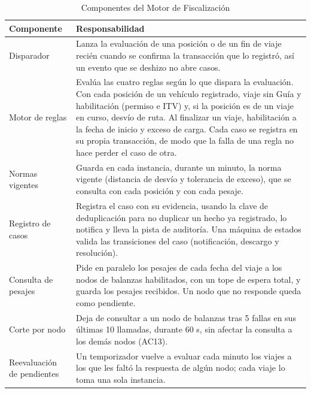 \begin{table}[H]
    \small
    \centering
    \caption{Componentes del Motor de Fiscalización}
    \label{tab:refinamiento-motor}
    \begin{tabular}{|p{3.6cm}|p{12.2cm}|}
        \hline
        \textbf{Componente} & \textbf{Responsabilidad} \\
        \hline
        Disparador & Lanza la evaluación de una posición o de un fin de viaje recién cuando se confirma la transacción que lo registró, así un evento que se deshizo no abre casos. \\
        \hline
        Motor de reglas & Evalúa las cuatro reglas según lo que dispara la evaluación. Con cada posición de un vehículo registrado, viaje sin Guía y habilitación (permiso e ITV) y, si la posición es de un viaje en curso, desvío de ruta. Al finalizar un viaje, habilitación a la fecha de inicio y exceso de carga. Cada caso se registra en su propia transacción, de modo que la falla de una regla no hace perder el caso de otra. \\
        \hline
        Normas vigentes & Guarda en cada instancia, durante un minuto, la norma vigente (distancia de desvío y tolerancia de exceso), que se consulta con cada posición y con cada pesaje. \\
        \hline
        Registro de casos & Registra el caso con su evidencia, usando la clave de deduplicación para no duplicar un hecho ya registrado, lo notifica y lleva la pista de auditoría. Una máquina de estados valida las transiciones del caso (notificación, descargo y resolución). \\
        \hline
        Consulta de pesajes & Pide en paralelo los pesajes de cada fecha del viaje a los nodos de balanzas habilitados, con un tope de espera total, y guarda los pesajes recibidos. Un nodo que no responde queda como pendiente. \\
        \hline
        Corte por nodo & Deja de consultar a un nodo de balanzas tras 5 fallas en sus últimas 10 llamadas, durante 60 s, sin afectar la consulta a los demás nodos (AC13). \\
        \hline
        Reevaluación de pendientes & Un temporizador vuelve a evaluar cada minuto los viajes a los que les faltó la respuesta de algún nodo; cada viaje lo toma una sola instancia. \\
        \hline
    \end{tabular}
\end{table}

\FloatBarrier

